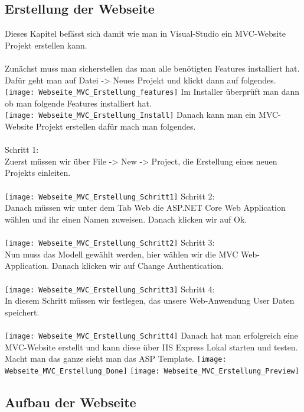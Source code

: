 {\subsection{Erstellung der Webseite}
Dieses Kapitel befässt sich damit wie man in Visual-Studio ein MVC-Website Projekt erstellen kann.\\ \\
Zunächst muss man sicherstellen das man alle benötigten Features installiert hat. Dafür geht man auf Datei -> Neues Projekt und klickt dann auf folgendes.\\
\texttt{[image: Webseite\_MVC\_Erstellung\_features]}
Im Installer überprüft man dann ob man folgende Features installiert hat.\\
\texttt{[image: Webseite\_MVC\_Erstellung\_Install]}
Danach kann man ein MVC-Website Projekt erstellen dafür mach man folgendes.\\ \\
Schritt 1:\\
Zuerst müssen wir über File -> New -> Project, die Erstellung eines neuen Projekts einleiten.\\ \\
\texttt{[image: Webseite\_MVC\_Erstellung\_Schritt1]}
Schritt 2:\\
Danach müssen wir unter dem Tab Web die ASP.NET Core Web Application wählen und ihr einen Namen zuweisen. Danach klicken wir auf Ok.\\ \\
\texttt{[image: Webseite\_MVC\_Erstellung\_Schritt2]}
Schritt 3:\\
Nun muss das Modell gewählt werden, hier wählen wir die MVC Web-Application. Danach klicken wir auf Change Authentication. \\ \\
\texttt{[image: Webseite\_MVC\_Erstellung\_Schritt3]}
Schritt 4:\\
In diesem Schritt müssen wir festlegen, das unsere Web-Anwendung User Daten speichert. \\ \\
\texttt{[image: Webseite\_MVC\_Erstellung\_Schritt4]}
Danach hat man erfolgreich eine MVC-Website erstellt und kann diese über IIS Express Lokal starten und testen. Macht man das ganze sieht man das ASP Template.
\texttt{[image: Webseite\_MVC\_Erstellung\_Done]}
\texttt{[image: Webseite\_MVC\_Erstellung\_Preview]}
\label{sec:erstellung}
\subsection{Aufbau der Webseite }
\label{sec:aufbau}
}
